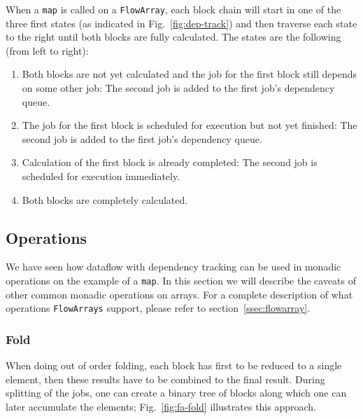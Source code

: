 \documentclass[runningheads,a4paper,fleqn]{llncs}
\begin{document}
When a \texttt{map} is called on a \texttt{FlowArray}, each block chain will
start in one of the three first states (as indicated in
Fig.~\ref{fig:dep-track}) 
and then traverse each state to the right until both blocks are fully
calculated. The states are the following (from left to right):

\begin{enumerate}
\item Both blocks are not yet calculated and the job for the first
  block still depends on some other job: The second job is added to
  the first job's dependency queue.
\item The job for the first block is scheduled for execution but not
  yet finished: The second job is added to the first job's dependency
  queue.
\item Calculation of the first block is already completed: The second
  job is scheduled for execution immediately.
\item Both blocks are completely calculated.
\end{enumerate}

\subsection{Operations}
We have seen how dataflow with dependency tracking can be used in
monadic operations on the example of a \texttt{map}. In this section
we will describe the caveats of other common monadic operations on
arrays. For a complete description of what operations \texttt{FlowArrays}
support, please refer to section~\ref{ssec:flowarray}.

\subsubsection{Fold}
When doing out of order folding, each block has first to be reduced to
a single element, then these results have to be combined to the final
result. During splitting of the jobs, one can create a binary tree of
blocks along which one can later accumulate the elements;
Fig.~\ref{fig:fa-fold} illustrates this approach.
\end{document}
